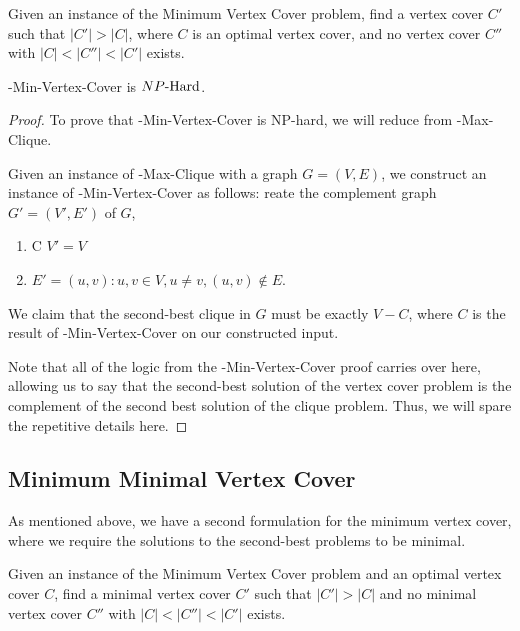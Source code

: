 \begin{definition}
Given an instance of the Minimum Vertex Cover problem, find a vertex cover $C'$ such that $|C'| > |C|$, where $C$ is an optimal vertex cover, and no vertex cover $C''$ with $|C| < |C''| < |C'|$ exists.
\end{definition}


\begin{theorem}
\exb{}-Min-Vertex-Cover is ${NP\text{-Hard{}}}$.
\end{theorem}
\begin{proof}
To prove that \exb{}-Min-Vertex-Cover is NP-hard, we will reduce from \exb{}-Max-Clique.

Given an instance of \exb{}-Max-Clique with a graph $G = (V, E)$, we construct an instance of \exb{}-Min-Vertex-Cover as follows:
reate the complement graph $G' = (V', E')$ of $G$,
\begin{enumerate}
    \item C $V' = V$ 
    \item $E' = {(u, v) : u, v \in V, u \neq v, (u, v) \notin E}$.
\end{enumerate}

We claim that the second-best clique in $G$ must be exactly $V - C$, where $C$ is the result of \exb{}-Min-Vertex-Cover on our constructed input.

Note that all of the logic from the \inob{}-Min-Vertex-Cover proof carries over here, allowing us to say that the second-best solution of the vertex cover problem is the complement of the second best solution of the clique problem. Thus, we will spare the repetitive details here.

\end{proof}
\subsection{Minimum Minimal Vertex Cover}
As mentioned above, we have a second formulation for the minimum vertex cover, where we require the solutions to the second-best problems to be minimal.
\begin{definition}
Given an instance of the Minimum Vertex Cover problem and an optimal vertex cover $C$, find a minimal vertex cover $C'$ such that $|C'| > |C|$ and no minimal vertex cover $C''$ with $|C| < |C''| < |C'|$ exists.
\end{definition}

